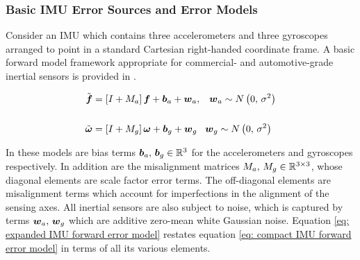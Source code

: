 \subsubsection{Basic IMU Error Sources and Error Models}

Consider an IMU which contains three accelerometers and three gyroscopes arranged to point in a standard Cartesian right-handed coordinate frame. A basic forward model framework appropriate for commercial- and automotive-grade inertial sensors is provided in \cite{groves2013principles}. 

\begin{align} \label{eq: compact IMU forward error model}
	\tilde{\boldsymbol{f}} &= \left[I + M_a\right] \boldsymbol{f} + \boldsymbol{b}_a + \boldsymbol{w}_a, \,\,\,\,\, \boldsymbol{w}_a \sim N\left(0,\,\sigma^2\right) \notag\\
	\\
	\tilde{\boldsymbol{\omega}} &= \left[I + M_g\right] \boldsymbol{\omega} + \boldsymbol{b}_g + \boldsymbol{w}_g \,\,\,\,\, \boldsymbol{w}_g \sim N\left(0,\,\sigma^2\right) \notag
\end{align}

In these models are bias terms $\boldsymbol{b}_a, \, \boldsymbol{b}_g \in \mathbb{R}^3$ for the accelerometers and gyroscopes respectively. In addition are the misalignment matrices $M_a, \, M_g \in \mathbb{R}^{3 \times 3}$, whose diagonal elements are scale factor error terms. The off-diagonal elements are misalignment terms which account for imperfections in the alignment of the sensing axes. All inertial sensors are also subject to noise, which is captured by terms $\boldsymbol{w}_a,\,\boldsymbol{w}_g$ which are additive zero-mean white Gaussian noise. Equation \ref{eq: expanded IMU forward error model} restates equation \ref{eq: compact IMU forward error model} in terms of all its various elements.

